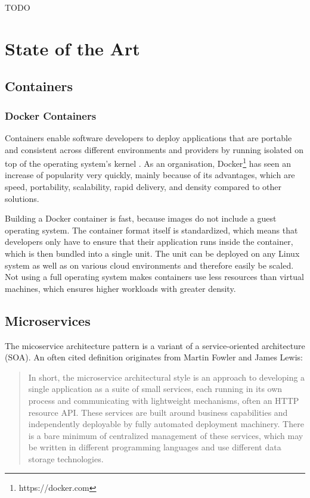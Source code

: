 TODO

\chapter{State of the Art}\label{state-of-the-art}

\section{Containers}\label{containers}

\subsection{Docker Containers}\label{docker-containers}

Containers enable software developers to deploy applications that are
portable and consistent across different environments and providers
\cite{baier-kub} by running isolated on top of the operating system's
kernel \cite{bashari}. As an organisation, Docker\footnote{https://docker.com}
has seen an increase of popularity very quickly, mainly because of its
advantages, which are speed, portability, scalability, rapid delivery,
and density \cite{bashari} compared to other solutions.

Building a Docker container is fast, because images do not include a
guest operating system. The container format itself is standardized,
which means that developers only have to ensure that their application
runs inside the container, which is then bundled into a single unit. The
unit can be deployed on any Linux system as well as on various cloud
environments and therefore easily be scaled. Not using a full operating
system makes containers use less resources than virtual machines, which
ensures higher workloads with greater density. \cite{joy2015}

\section{Microservices}\label{microservices}

The micoservice architecture pattern is a variant of a service-oriented
architecture (SOA). An often cited definition originates from Martin
Fowler and James Lewis:

\begin{quote}
In short, the microservice architectural style is an approach to
developing a single application as a suite of small services, each
running in its own process and communicating with lightweight
mechanisms, often an HTTP resource API. These services are built around
business capabilities and independently deployable by fully automated
deployment machinery. There is a bare minimum of centralized management
of these services, which may be written in different programming
languages and use different data storage technologies.
\cite{lewis2014microservices}
\end{quote}

